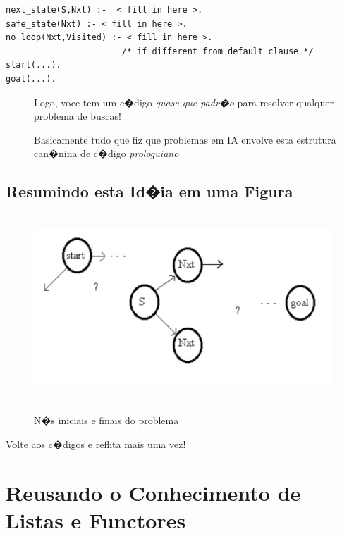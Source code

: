 \documentclass[final,a4paper]{article}
\begin{document}
\begin{lstlisting}
next_state(S,Nxt) :-  < fill in here >.
safe_state(Nxt) :- < fill in here >.
no_loop(Nxt,Visited) :- < fill in here >.     
                       /* if different from default clause */
start(...).
goal(...).

\end{lstlisting}


\begin{description}

\item []  Logo, voce tem um c�digo {\em quase que padr�o} para resolver qualquer
problema de buscas!

\item [] Basicamente tudo que fiz que problemas em IA envolve 
esta estrutura can�nina de c�digo {\em prologuiano}
\end{description}


\newpage

\subsection{Resumindo esta Id�ia em uma Figura}

\begin{figure}[!htb]
\centering
\includegraphics[width=12cm, height=7cm]{figuras/nos_estados_next.pdf}
\label{fig_nos_estados}
\caption{N�s iniciais e finais do problema}
\end{figure}


 Volte aos c�digos e reflita mais uma vez!



\section{Reusando o Conhecimento de Listas e Functores}
\end{document}
